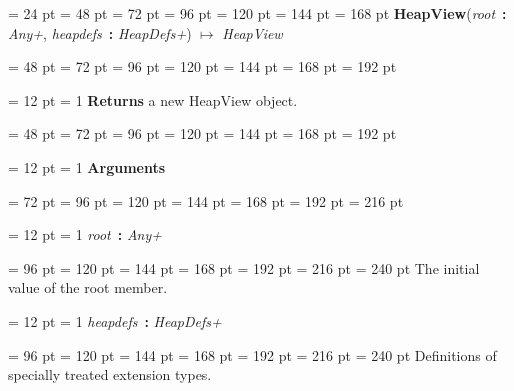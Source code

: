 {{{} \noindent
\par}
{\par \noindent  \leftskip = 24 pt  \leftmargini = 48 pt  \leftmarginii = 72 pt  \leftmarginiii = 96 pt  \leftmarginiv = 120 pt  \leftmarginv = 144 pt  \leftmarginvi = 168 pt {\bf {\large {\bf HeapView\/}}\/}({\em root\/}~{\bf :}  {\em Any+\/}, {\em heapdefs\/}~{\bf :}  {\em HeapDefs+\/}) \(\mapsto \)  {\em HeapView\/}{\par \noindent
{\par \noindent  \leftskip = 48 pt  \leftmargini = 72 pt  \leftmarginii = 96 pt  \leftmarginiii = 120 pt  \leftmarginiv = 144 pt  \leftmarginv = 168 pt  \leftmarginvi = 192 pt {\par \noindent
{\par \pagebreak[3.100000] \noindent \hangindent = 12 pt \hangafter = 1 
{\bf Returns \/} a new HeapView object.\par}
\par}
\par}
{\par \noindent  \leftskip = 48 pt  \leftmargini = 72 pt  \leftmarginii = 96 pt  \leftmarginiii = 120 pt  \leftmarginiv = 144 pt  \leftmarginv = 168 pt  \leftmarginvi = 192 pt {\par \noindent
{\par \pagebreak[3.100000] \noindent \hangindent = 12 pt \hangafter = 1 
{\bf Arguments\/}\par}
{\par \noindent  \leftskip = 72 pt  \leftmargini = 96 pt  \leftmarginii = 120 pt  \leftmarginiii = 144 pt  \leftmarginiv = 168 pt  \leftmarginv = 192 pt  \leftmarginvi = 216 pt {\par \noindent
{\par \pagebreak[3.000000] \noindent \hangindent = 12 pt \hangafter = 1 
{\em root\/}~{\bf :}  {\em Any+\/}\par}
{\par \noindent  \leftskip = 96 pt  \leftmargini = 120 pt  \leftmarginii = 144 pt  \leftmarginiii = 168 pt  \leftmarginiv = 192 pt  \leftmarginv = 216 pt  \leftmarginvi = 240 pt  The initial value of the root member.\par}
{\par \pagebreak[3.000000] \noindent \hangindent = 12 pt \hangafter = 1 
{\em heapdefs\/}~{\bf :}  {\em HeapDefs+\/}\par}
{\par \noindent  \leftskip = 96 pt  \leftmargini = 120 pt  \leftmarginii = 144 pt  \leftmarginiii = 168 pt  \leftmarginiv = 192 pt  \leftmarginv = 216 pt  \leftmarginvi = 240 pt  Definitions of specially treated extension types.
}}}}}}}}
